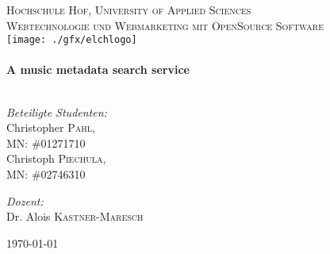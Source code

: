 \begin{titlepage}

\begin{center}

\textsc{\LARGE  Hochschule Hof, University of Applied Sciences}\\[1.5cm]
\textsc{\Large Webtechnologie und Webmarketing mit OpenSource Software}\\[0.5cm]

\texttt{[image: ./gfx/elchlogo]}\\[1cm]    
\HRule \\[0.4cm]
{ \huge \bfseries A music metadata search service}\\[0.4cm]

\HRule \\[1.5cm]

\begin{minipage}{0.4\textwidth}
\begin{flushleft} \large
\emph{Beteiligte Studenten:}\\
Christopher \textsc{Pahl},\\
MN: \#01271710\\
Christoph \textsc{Piechula},\\
MN: \#02746310\\
\end{flushleft}
\end{minipage}
\begin{minipage}{0.4\textwidth}
\begin{flushright} \large
\emph{Dozent:} \\
Dr. Alois \textsc{Kastner-Maresch}
\end{flushright}
\end{minipage}

\vfill

{\large \today}

\end{center}

\end{titlepage}
